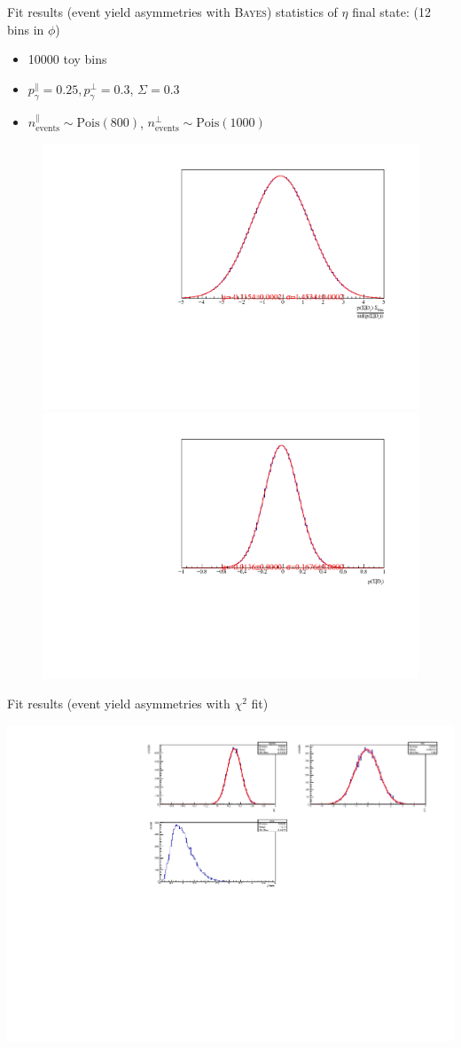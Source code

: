 \documentclass[11pt,aspectratio=169,dvipsnames]{beamer}
\begin{document}
	\begin{frame}{Fit results (event yield asymmetries with \textsc{Bayes})}
		statistics of $\eta$ final state: (12 bins in $\phi$)
		\begin{itemize}[label=$\blacktriangleright$]
			\item 10000 toy bins
			\item $p_\gamma^\parallel=0.25,p_\gamma^\bot=0.3$, $\Sigma=0.3$
			\item $n_\text{events}^\parallel\sim\text{Pois}(800)$, $n_\text{events}^\bot\sim\text{Pois}(1000)$ 
		\end{itemize}
	\begin{figure}[htbp]
		\includegraphics[width=.49\linewidth]{../../bayes/toyMC/plots/combined_post_add.pdf}
		\includegraphics[width=.49\linewidth]{../../bayes/toyMC/plots/combined_post_add_raw.pdf}
	\end{figure}

	\end{frame}
	\begin{frame}{Fit results (event yield asymmetries with $\chi^2$ fit)}
		\begin{center}
		\includegraphics[width=.9\linewidth]{../../bayes/toyMC/plots/eta_chi2_12bins.pdf}
		\end{center}

\end{frame}
\end{document}
